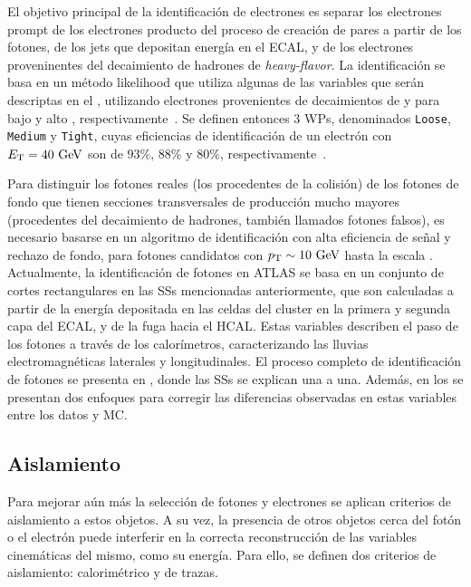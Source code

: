 El objetivo principal de la identificaci\'on de electrones es separar los electrones prompt de los electrones producto del proceso de creaci\'on de pares a partir de los fotones, de los jets que depositan energ\'ia en el \ac{ECAL}, y de los electrones proveninentes del decaimiento de hadrones de \textit{heavy-flavor}. La identificaci\'on se basa en un m\'etodo likelihood que utiliza algunas de las variables que ser\'an descriptas en el \Ch{\ref{ch:pid_ss}}, utilizando electrones provenientes de decaimientos de \jpsi y \Zboson para bajo y alto \et, respectivamente~\cite{ATLAS-EGamma-Performance-2024}. Se definen entonces 3 \acp{WP}, denominados \texttt{Loose}, \texttt{Medium} y \texttt{Tight}, cuyas eficiencias de identificaci\'on de un electr\'on con \(E_{\text{T}}=40~\text{GeV}\) son de \(93\%, \, 88\%\) y \(80\%\), respectivamente~\cite{ATLAS-EGamma-Calibration-2015-2016}.


Para distinguir los fotones reales (los procedentes de la colisión) de los fotones de fondo que tienen secciones transversales de producción mucho mayores (procedentes del decaimiento de hadrones, también llamados fotones falsos), es necesario basarse en un algoritmo de identificación con alta eficiencia de señal y rechazo de fondo, para fotones candidatos con \(p_{\text{T}} \sim 10~\text{GeV}\) hasta la escala \tev.
Actualmente, la identificación de fotones en \ac{ATLAS} se basa en un conjunto de cortes rectangulares en las \acp{SS} mencionadas anteriormente, que son calculadas a partir de la energía depositada en las celdas del cluster en la primera y segunda capa del \ac{ECAL}, y de la fuga hacia el \ac{HCAL}. Estas variables describen el paso de los fotones a través de los calorímetros, caracterizando las lluvias electromagnéticas laterales y longitudinales.
El proceso completo de identificación de fotones se presenta en \Ch{\ref{ch:pid_ss}}, donde las \acp{SS} se explican una a una. Además, en los \Chs{\ref{ch:ffs}}{\ref{ch:cellrw}} se presentan dos enfoques para corregir las diferencias observadas en estas variables entre los datos y \ac{MC}.





\subsection{Aislamiento}
\label{subsec:objects:egamma:iso}

Para mejorar aún más la selecci\'on de fotones y electrones se aplican criterios de aislamiento a estos objetos. A su vez, la presencia de otros objetos cerca del fotón o el electrón puede interferir en la correcta reconstrucción de las variables cinemáticas del mismo, como su energía. Para ello, se definen dos criterios de aislamiento: calorim\'etrico y de trazas. 

